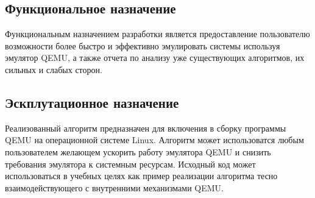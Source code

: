 \subsection{Функциональное назначение}
Функциональным назначением разработки является предоставление пользователю возможности более быстро и эффективно эмулировать системы используя эмулятор QEMU, а также отчета по анализу уже существующих алгоритмов, их сильных и слабых сторон.

\subsection{Эскплутационное назначение}
Реализованный алгоритм предназначен для включения в сборку программы QEMU на операционной системе Linux. Алгоритм может использоватся любым пользователем желающем ускорить работу эмулятора QEMU и снизить требования эмулятора к системным ресурсам. Исходный код может использоваться в учебных целях как пример реализации алгоритма тесно взаимодействующего с внутренними механизмами QEMU.